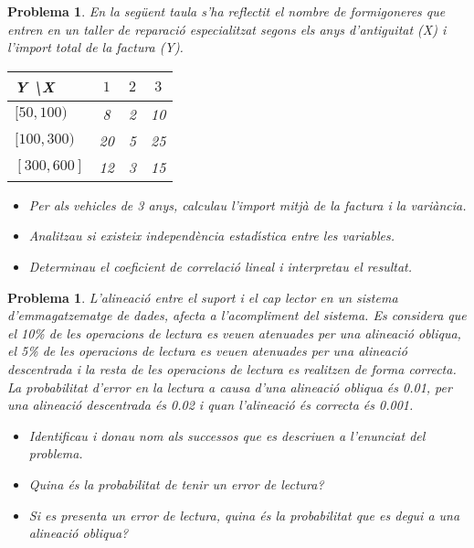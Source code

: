 \documentclass[a4paper,12pt]{article}
\newcounter{prbcont}
\newtheorem{problema}[prbcont]{Problema}
\begin{document}
\begin{problema}
En la seg\"uent taula s'ha reflectit el nombre de formigoneres que entren en un taller de reparaci\'o especialitzat segons els anys d'antiguitat (X) i l'import total de la factura (Y).
\begin{center}
\begin{tabular}{|l||c|c|c|}\hline
Y \textbackslash X & $1$ & $2 $& $3$ \\ \hline \hline
$[50,100)$ & 8 & 2 & 10 \\ \hline
$[100,300)$ & 20 & 5 & 25 \\ \hline
$[300,600]$ & 12 & 3 & 15\\ \hline
\end{tabular}
\end{center}
\begin{itemize}
\item [a)] Per als vehicles de 3 anys, calculau l'import mitj\`a de la factura i la vari\`ancia.
\item [b)] Analitzau si existeix independ\`encia estad\'{\i}stica entre les variables.
\item [c)] Determinau el coeficient de correlaci\'o lineal i interpretau el resultat.
\end{itemize}
\end{problema}

\vskip 0.5cm

\begin{problema}
L'alineaci\'o entre el suport i el cap lector en un sistema d'emmagatzematge de dades, afecta a l'acompliment del sistema. Es considera que el 10\% de les operacions de lectura es veuen atenuades per una alineaci\'o obliqua, el 5\% de les operacions de lectura es veuen atenuades per una alineaci\'o descentrada i la resta de les operacions de lectura es realitzen de forma correcta. La probabilitat d'error en la lectura a causa d'una alineaci\'o obliqua \'es 0.01, per una alineaci\'o descentrada \'es 0.02 i quan l'alineaci\'o \'es correcta \'es 0.001.
\begin{itemize}
\item [a)]  Identificau i donau nom als successos que es descriuen a l'enunciat del problema.
\item [b)] Quina \'es la probabilitat de tenir un error de lectura?
\item [c)] Si es presenta un error de lectura, quina \'es la probabilitat que es degui a una alineaci\'o obliqua?
\end{itemize}
\end{problema}
\end{document}
